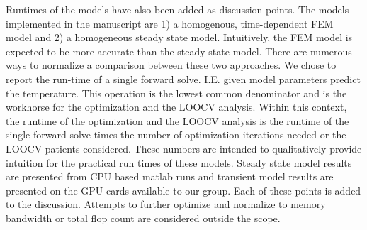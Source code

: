 \documentclass[letterpaper,12pt]{report}
\begin{document}
\begin{enumerate}
{Runtimes of the models have also been added as discussion points.
The models implemented in the manuscript are 1) a homogenous,
time-dependent FEM model and 2) a homogeneous steady state model.
Intuitively, the FEM model is expected to be more accurate than the steady state model.
There are numerous ways to normalize a comparison between these two
approaches. We chose to report the run-time of a single forward solve. I.E.
given model parameters predict the temperature. This operation is the
lowest common denominator and is the workhorse for the optimization and the
LOOCV analysis. Within this context, the runtime of the optimization and the
LOOCV analysis is the runtime of the single forward solve times the number
of optimization iterations needed or the LOOCV patients considered.
These numbers are intended to qualitatively provide
intuition for the practical run times of these models. 
Steady state model
results are presented from CPU based matlab runs and transient model results are
presented on the GPU cards available to our group. 
Each of these points
is added to the discussion.
Attempts to further optimize and normalize to memory bandwidth or total
flop count are considered outside the scope. 

}
\end{enumerate}
\end{document}
